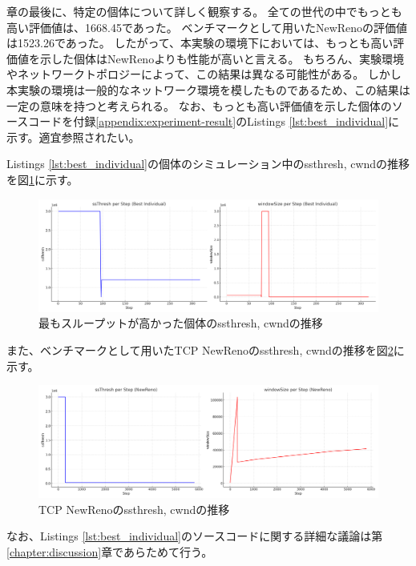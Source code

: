 \documentclass[a4paper,11pt]{jreport}
\newcommand{\figref}[1]{図\ref{#1}}
\newcommand{\chapref}[1]{第\ref{#1}章}
\newcommand{\appendixref}[1]{付録\ref{#1}}
\begin{document}
章の最後に、特定の個体について詳しく観察する。
全ての世代の中でもっとも高い評価値は、1668.45であった。
ベンチマークとして用いたNewRenoの評価値は1523.26であった。
したがって、本実験の環境下においては、もっとも高い評価値を示した個体はNewRenoよりも性能が高いと言える。
もちろん、実験環境やネットワークトポロジーによって、この結果は異なる可能性がある。
しかし本実験の環境は一般的なネットワーク環境を模したものであるため、この結果は一定の意味を持つと考えられる。
なお、もっとも高い評価値を示した個体のソースコードを\appendixref{appendix:experiment-result}のListings \ref{lst:best_individual}に示す。適宜参照されたい。

Listings \ref{lst:best_individual}の個体のシミュレーション中のssthresh, cwndの推移を\figref{figure:best_individual_result}に示す。
\begin{figure}[htbp]
  \centering
  \includegraphics[width=1.0\linewidth]{fig/chap05/best_result.png}
  \caption{最もスループットが高かった個体のssthresh, cwndの推移}
  \label{figure:best_individual_result}
\end{figure}
また、ベンチマークとして用いたTCP NewRenoのssthresh, cwndの推移を\figref{figure:newreno_result}に示す。
\begin{figure}[htbp]
  \centering
  \includegraphics[width=1.0\linewidth]{fig/chap05/newreno_result.png}
  \caption{TCP NewRenoのssthresh, cwndの推移}
  \label{figure:newreno_result}
\end{figure}

なお、Listings \ref{lst:best_individual}のソースコードに関する詳細な議論は\chapref{chapter:discussion}であらためて行う。

\newpage
\end{document}
